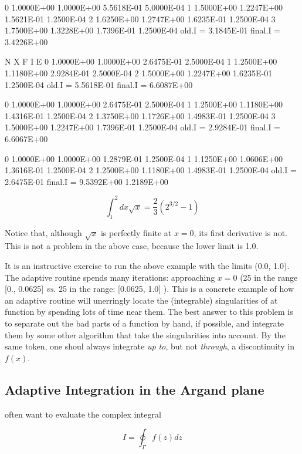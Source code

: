0 1.0000E+00  1.0000E+00 5.5618E-01 5.0000E-04
1 1.5000E+00  1.2247E+00 1.5621E-01 1.2500E-04
2 1.6250E+00  1.2747E+00 1.6235E-01 1.2500E-04
3 1.7500E+00  1.3228E+00 1.7396E-01 1.2500E-04
old.I = 3.1845E-01  final.I = 3.4226E+00

N      X            F          I             E
0 1.0000E+00  1.0000E+00 2.6475E-01 2.5000E-04
1 1.2500E+00  1.1180E+00 2.9284E-01 2.5000E-04
2 1.5000E+00  1.2247E+00 1.6235E-01 1.2500E-04
old.I = 5.5618E-01  final.I = 6.6087E+00

0 1.0000E+00  1.0000E+00 2.6475E-01 2.5000E-04
1 1.2500E+00  1.1180E+00 1.4316E-01 1.2500E-04
2 1.3750E+00  1.1726E+00 1.4983E-01 1.2500E-04
3 1.5000E+00  1.2247E+00 1.7396E-01 1.2500E-04
old.I = 2.9284E-01  final.I = 6.6067E+00

0 1.0000E+00  1.0000E+00 1.2879E-01 1.2500E-04
1 1.1250E+00  1.0606E+00 1.3616E-01 1.2500E-04
2 1.2500E+00  1.1180E+00 1.4983E-01 1.2500E-04
old.I = 2.6475E-01  final.I = 9.5392E+00
1.2189E+00

\begin{equation}
\int_{1}^{2}dx\sqrt{x} = \frac{2}{3} \left( 2^{3/2} - 1 \right)
\end{equation}

Notice that, although $\sqrt{x}$ is perfectly finite at $x = 0$, its first derivative is not. This is not a problem in the above case, because the lower limit is 1.0.

It is an instructive exercise to run the above example with the limits (0.0, 1.0). The adaptive routine spends many iterations: approaching $x = 0$ (25 in the range [0., 0.0625] \textit{vs.} 25 in the range: [0.0625, 1.0] ). This is a concrete example of how an adaptive routine will unerringly locate the (integrable) singularities of at function by spending lots of time near them. The best answer to this problem is to separate out the bad parts of a function by hand, if possible, and integrate them by some other algorithm that take the singularities into account. By the same token, one shoul always integrate \textit{up to}, but not \textit{through}, a discontinuity in $f(x)$.

\subsection{Adaptive Integration in the Argand plane}
 often want to evaluate the complex integral

\begin{equation}
I = \oint_{\Gamma}f(z)dz
\end{equation}

